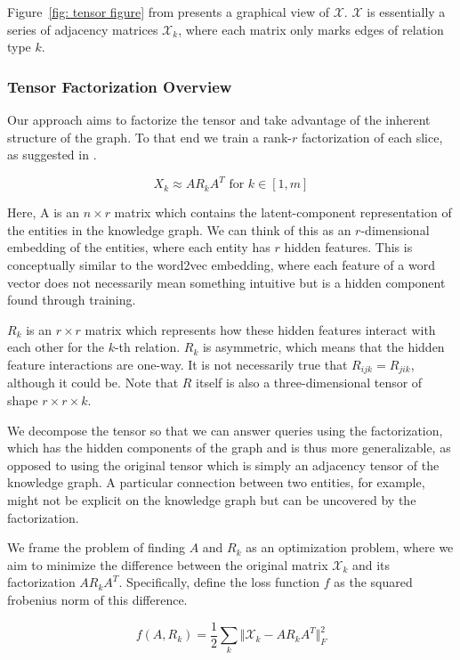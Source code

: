 \documentclass[pageno]{final_paper}
\begin{document}
Figure~\ref{fig: tensor figure} from \cite{Chang2014} presents a graphical view
of $\mathcal{X}$. $\mathcal{X}$ is essentially a series of adjacency matrices
$\mathcal{X}_k$, where each matrix only marks edges of relation type $k$. \\

\subsubsection{Tensor Factorization Overview}
\label{Tensor Factorization Overview}

Our approach aims to factorize the tensor and take advantage of the inherent
structure of the graph. To that end we train a rank-$r$ factorization of each
slice, as suggested in \cite{Bader2007, Nickel2011}.

$$X_k \approx A R_k A^T \text{ for } k \in [1,m]$$

Here, A is an $n\times r$ matrix which contains the latent-component
representation of the entities in the knowledge graph. We can think of this as
an $r$-dimensional embedding of the entities, where each entity has $r$ hidden
features. This is conceptually similar to the word2vec embedding, where each
feature of a word vector does not necessarily mean something intuitive but is a
hidden component found through training.

$R_k$ is an $r\times r$ matrix which represents how these hidden features
interact with each other for the $k$-th relation. $R_k$ is asymmetric, which
means that the hidden feature interactions are one-way. It is not necessarily
true that $R_{ijk} = R_{jik}$, although it could be. Note that $R$ itself is
also a three-dimensional tensor of shape $r\times r\times k$.

We decompose the tensor so that we can answer queries using the factorization,
which has the hidden components of the graph and is thus more generalizable, as
opposed to using the original tensor which is simply an adjacency tensor of the
knowledge graph. A particular connection between two entities, for example,
might not be explicit on the knowledge graph but can be uncovered by the
factorization.

We frame the problem of finding $A$ and $R_k$ as an optimization problem, where
we aim to minimize the difference between the original matrix $\mathcal{X}_k$
and its factorization $AR_kA^T$. Specifically, define the loss function $f$ as
the squared frobenius norm of this difference.

\begin{equation}
\label{eq: loss function}
    f(A, R_k) = \dfrac{1}{2} \sum_k \Vert \mathcal{X}_k - AR_kA^T \Vert _F^2
\end{equation}
\end{document}
